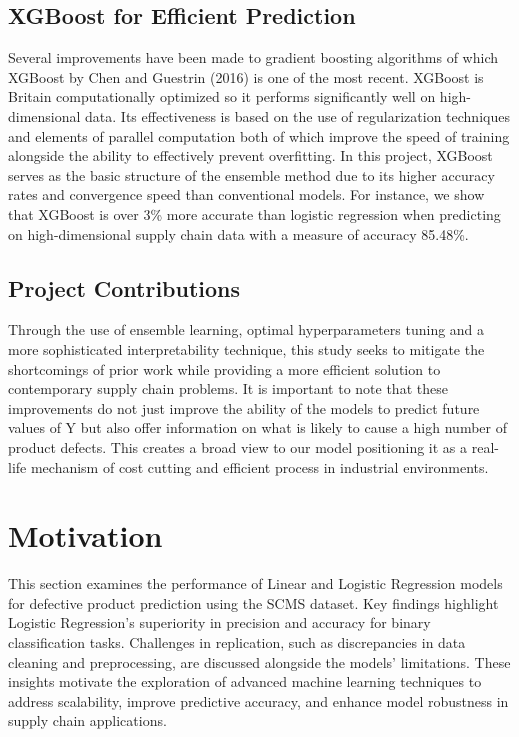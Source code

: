 \documentclass[conference]{IEEEtran}
\begin{document}
\subsection{XGBoost for Efficient Prediction}
Several improvements have been made to gradient boosting algorithms of which XGBoost by Chen and Guestrin (2016) \cite{xgboost2021example} is one of the most recent. XGBoost is Britain computationally optimized so it performs significantly well on high-dimensional data. Its effectiveness is based on the use of regularization techniques and elements of parallel computation both of which improve the speed of training alongside the ability to effectively prevent overfitting. In this project, XGBoost serves as the basic structure of the ensemble method due to its higher accuracy rates and convergence speed than conventional models. For instance, we show that XGBoost is over 3\% more accurate than logistic regression when predicting on high-dimensional supply chain data with a measure of accuracy 85.48\%.

\subsection{Project Contributions}
Through the use of ensemble learning, optimal hyperparameters tuning and a more sophisticated interpretability technique, this study seeks to mitigate the shortcomings of prior work while providing a more efficient solution to contemporary supply chain problems. It is important to note that these improvements do not just improve the ability of the models to predict future values of Y but also offer information on what is likely to cause a high number of product defects. This creates a broad view to our model positioning it as a real-life mechanism of cost cutting and efficient process in industrial environments.


\section{Motivation}

This section examines the performance of Linear and Logistic Regression models for defective product prediction using the SCMS dataset. Key findings highlight Logistic Regression’s superiority in precision and accuracy for binary classification tasks. Challenges in replication, such as discrepancies in data cleaning and preprocessing, are discussed alongside the models' limitations. These insights motivate the exploration of advanced machine learning techniques to address scalability, improve predictive accuracy, and enhance model robustness in supply chain applications.
\end{document}
